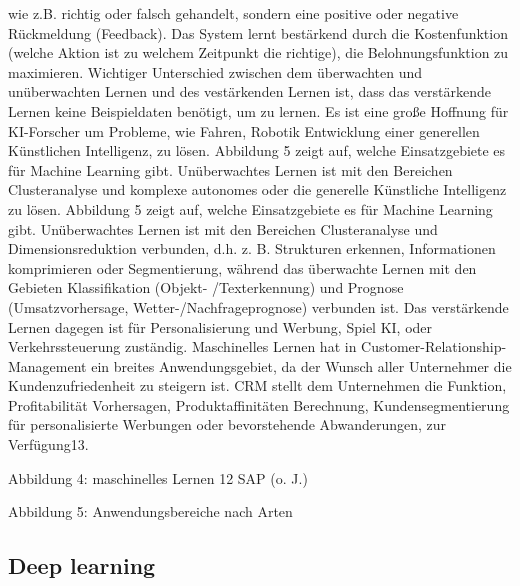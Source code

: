 wie z.B. richtig oder falsch gehandelt, sondern eine positive oder negative Rückmeldung (Feedback). Das System lernt bestärkend durch die Kostenfunktion 
(welche Aktion ist zu welchem Zeitpunkt die richtige), die Belohnungsfunktion zu maximieren. Wichtiger Unterschied zwischen dem überwachten und 
unüberwachten Lernen und des vestärkenden Lernen ist, dass das verstärkende Lernen keine Beispieldaten benötigt, um zu lernen. Es ist eine große Hoffnung für KI-Forscher um Probleme, wie Fahren, Robotik Entwicklung einer generellen 
Künstlichen Intelligenz, zu lösen. Abbildung 5 zeigt auf, welche Einsatzgebiete es für Machine Learning gibt. Unüberwachtes Lernen ist mit den Bereichen 
Clusteranalyse und komplexe autonomes oder die generelle Künstliche Intelligenz zu lösen. Abbildung 5 zeigt auf, welche Einsatzgebiete es für Machine Learning gibt. 
Unüberwachtes Lernen ist mit den Bereichen Clusteranalyse und Dimensionsreduktion verbunden, d.h. z. B. Strukturen erkennen, Informationen 
komprimieren oder Segmentierung, während das überwachte Lernen mit den Gebieten Klassifikation (Objekt- /Texterkennung) und Prognose 
(Umsatzvorhersage, Wetter-/Nachfrageprognose) verbunden ist. Das verstärkende Lernen dagegen ist für Personalisierung und Werbung, Spiel KI, oder 
Verkehrssteuerung zuständig. Maschinelles Lernen hat in Customer-Relationship-Management ein breites Anwendungsgebiet, da der Wunsch aller 
Unternehmer die Kundenzufriedenheit zu steigern ist. CRM stellt dem Unternehmen die Funktion, Profitabilität Vorhersagen, Produktaffinitäten Berechnung, 
Kundensegmentierung für personalisierte Werbungen oder bevorstehende Abwanderungen, zur Verfügung13.

Abbildung 4: maschinelles Lernen
12 SAP (o. J.)

Abbildung 5: Anwendungsbereiche nach Arten


\subsection{Deep learning}

